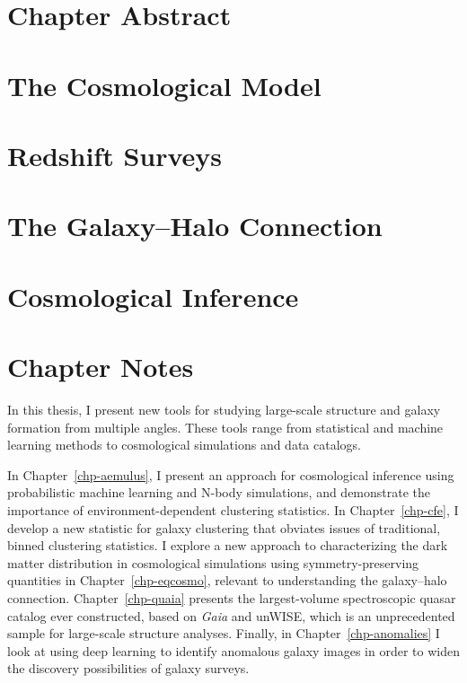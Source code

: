 \section{Chapter Abstract}


\section{The Cosmological Model}


\section{Redshift Surveys}


\section{The Galaxy--Halo Connection}


\section{Cosmological Inference}


\section{Chapter Notes}

In this thesis, I present new tools for studying large-scale structure and galaxy formation from multiple angles.
These tools range from statistical and machine learning methods to cosmological simulations and data catalogs.

In Chapter~\ref{chp-aemulus}, I present an approach for cosmological inference using probabilistic machine learning and N-body simulations, and demonstrate the importance of environment-dependent clustering statistics.
In Chapter~\ref{chp-cfe}, I develop a new statistic for galaxy clustering that obviates issues of traditional, binned clustering statistics.
I explore a new approach to characterizing the dark matter distribution in cosmological simulations using symmetry-preserving quantities in Chapter~\ref{chp-eqcosmo}, relevant to understanding the galaxy--halo connection.
Chapter~\ref{chp-quaia} presents the largest-volume spectroscopic quasar catalog ever constructed, based on \emph{Gaia} and unWISE, which is an unprecedented sample for large-scale structure analyses.
Finally, in Chapter~\ref{chp-anomalies} I look at using deep learning to identify anomalous galaxy images in order to widen the discovery possibilities of galaxy surveys.

